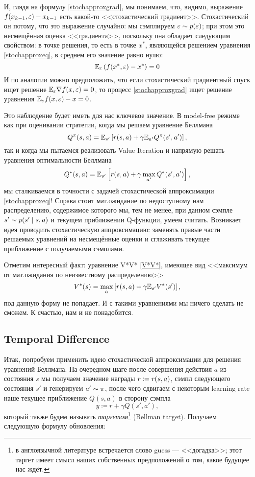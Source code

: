 И, глядя на формулу \eqref{stochapproxgrad}, мы понимаем, что, видимо, выражение $f(x_{k-1}, \eps) \HM- x_{k-1}$ есть какой-то <<стохастический градиент>>. Стохастический он потому, что это выражение случайно: мы сэмплируем $\varepsilon \sim p(\varepsilon)$; при этом это несмещённая оценка <<градиента>>, поскольку она обладает следующим свойством: в точке решения, то есть в точке $x^*$, являющейся решением уравнения \eqref{stochapproxeq}, в среднем его значение равно нулю: 
$$\mathbb{E}_{\varepsilon} \left( f(x^*, \varepsilon) - x^* \right) = 0$$
И по аналогии можно предположить, что если стохастический градиентный спуск ищет решение $\E_{\eps} \nabla f(x, \eps) \HM= 0$, то процесс \eqref{stochapproxgrad} ищет решение уравнения $\E_{\eps} f(x, \eps) \HM- x \HM= 0$.

Это наблюдение будет иметь для нас ключевое значение. В model-free режиме как при оценивании стратегии, когда мы решаем уравнение Беллмана
$$Q^{\pi}(s, a) = \mathbb{E}_{s'} \left[ r(s, a) + \gamma \mathbb{E}_{a'} Q^{\pi}(s', a') \right],$$
так и когда мы пытаемся реализовать Value Iteration и напрямую решать уравнения оптимальности Беллмана
$$Q^*(s, a) = \mathbb{E}_{s'} \left[ r(s, a) + \gamma \max_{a'} Q^*(s', a') \right],$$
мы сталкиваемся в точности с задачей стохастической аппроксимации \eqref{stochapproxeq}! Справа стоит мат.ожидание по недоступному нам распределению, содержимое которого мы, тем не менее, при данном сэмпле $s' \HM\sim p(s' \mid s, a)$ и текущем приближении Q-функции, умеем считать. Возникает идея проводить стохастическую аппроксимацию: заменять правые части решаемых уравнений на несмещённые оценки и сглаживать текущее приближение с получаемыми сэмплами.

Отметим интересный факт: уравнение V*V* \eqref{V*V*}, имеющее вид <<максимум от мат.ожидания по неизвестному распределению>>
$$V^*(s) = \max_{a} \left[ r(s, a) + \gamma \mathbb{E}_{s'}V^*(s') \right],$$
под данную форму не попадает. И с такими уравнениями мы ничего сделать не сможем. К счастью, нам и не понадобится.

\subsection{Temporal Difference}


Итак, попробуем применить идею стохастической аппроксимации для решения уравнений Беллмана. На очередном шаге после совершения действия $a$ из состояния $s$ мы получаем значение награды $r \HM\coloneqq r(s, a)$, сэмпл следующего состояния $s'$ и генерируем $a' \HM\sim \pi$, после чего сдвигаем с некоторым learning rate наше текущее приближение $Q(s, a)$ в сторону сэмпла
$$y \coloneqq r + \gamma Q(s', a'),$$
который также будем называть \emph{таргетом}\footnote{в англоязычной литературе встречается слово guess --- <<догадка>>; этот таргет имеет смысл наших собственных предположений о том, какое будущее нас ждёт.} (Bellman target). Получаем следующую формулу обновления:

